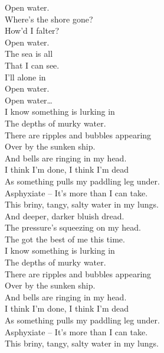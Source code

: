 Open water. \\
Where's the shore gone? \\
How'd I falter? \\
Open water. \\

The sea is all \\
That I can see. \\
I'll  alone in \\
Open water. \\

Open water… \\

I know something is lurking in \\
The depths of murky water. \\
There are ripples and bubbles appearing \\
Over by the sunken ship. \\

And bells are ringing in my head. \\
I think I'm done, I think I'm dead \\
As something pulls my paddling leg under. \\

Asphyxiate -- It's more than I can take. \\
This briny, tangy, salty water in my lungs. \\

And deeper, darker bluish dread. \\
The pressure's squeezing on my head. \\
The  got the best of me this time. \\

I know something is lurking in \\
The depths of murky water. \\
There are ripples and bubbles appearing \\
Over by the sunken ship. \\

And bells are ringing in my head. \\
I think I'm done, I think I'm dead \\
As something pulls my paddling leg under. \\

Asphyxiate -- It's more than I can take. \\
This briny, tangy, salty water in my lungs. \\


